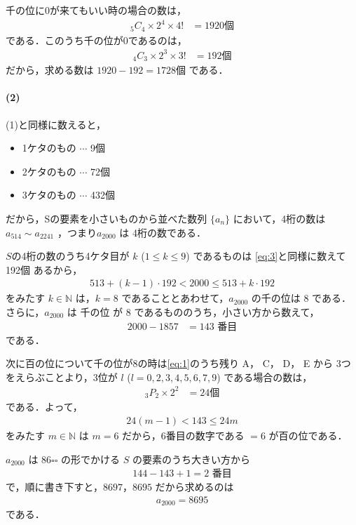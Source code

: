 \documentclass[../../main.tex]{subfiles}
\begin{document}
千の位に$0$が来てもいい時の場合の数は，
\begin{align}
  {}_5C_4 \times 2^4 \times 4! &= 1920 \text{個} \label{eq:2}
\end{align}
である．このうち千の位が0であるのは，
\begin{align}
  {}_4C_3 \times 2^3 \times 3! &= 192 \text{個} \label{eq:3}
\end{align}
だから，求める数は $1920 - 192 = 1728 \text{個}$ である．

\paragraph{(2)}

(1)と同様に数えると，
\begin{itemize}
  \item 1ケタのもの $\cdots$ 9個 \\
  \item 2ケタのもの $\cdots$ 72個 \\
  \item 3ケタのもの $\cdots$ 432個
\end{itemize}
だから，Sの要素を小さいものから並べた数列 $\{a_n\}$ において，4桁の数は $a_{514} \sim a_{2241}$ ，つまり$a_{2000}$ は 4桁の数である．

$S$の4桁の数のうち4ケタ目が $k$ ($1 \le k \le 9$) であるものは
\cref{eq:3}と同様に数えて 192個 あるから，
\begin{align}
  513 + (k-1) \cdot 192 < 2000 \le 513 + k \cdot 192
\end{align}
をみたす $k \in \mathbb{N}$ は，$k=8$ であることとあわせて，$a_{2000}$ の千の位は 8 である．さらに，$a_{2000}$ は 千の位 が 8 であるもののうち，小さい方から数えて，
\begin{align}
  2000 - 1857 &= 143 \text{ 番目}
\end{align}
である．

次に百の位について千の位が$8$の時は\cref{eq:1}のうち残り A， C， D， E から 3つをえらぶことより，3位が $l$ ($l = 0,2,3,4,5,6,7,9$) である場合の数は，
\begin{align}
  {}_3P_2 \times 2^2 &= 24 \text{個}
\end{align}
である．よって，
\begin{align}
  24(m-1) < 143 \le 24m
\end{align}
をみたす $m \in \mathbb{N}$ は $m = 6$ だから，6番目の数字である $=6$ が百の位である．

$a_{2000}$ は $8 6 \square \square$ の形でかける $S$ の要素のうち大きい方から
\begin{align}
  144 - 143 + 1 = 2 \text{ 番目}
\end{align}
で，順に書き下すと，$8697$，$8695$
だから求めるのは
\begin{align}
  a_{2000} = 8695
\end{align}
である．
\end{document}
